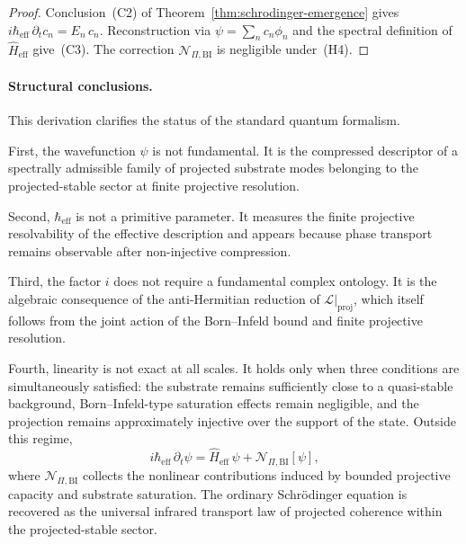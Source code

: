     \begin{proof}
      Conclusion~(C2) of Theorem~\ref{thm:schrodinger-emergence} gives
      $i\hbar_{\mathrm{eff}}\,\partial_t c_n = E_n\,c_n$.
      Reconstruction via $\psi = \sum_n c_n\phi_n$ and the spectral definition of
      $\hat{H}_{\mathrm{eff}}$ give~(C3).
      The correction $\mathcal{N}_{\Pi,\mathrm{BI}}$ is negligible under~(H4).
      \end{proof}

    \paragraph{Structural conclusions.}

      This derivation clarifies the status of the standard quantum formalism.

      First, the wavefunction $\psi$ is not fundamental.
      It is the compressed descriptor of a spectrally admissible family of projected substrate
      modes belonging to the projected-stable sector at finite projective resolution.

      Second, $\hbar_{\mathrm{eff}}$ is not a primitive parameter.
      It measures the finite projective resolvability of the effective description and appears
      because phase transport remains observable after non-injective compression.

      Third, the factor $i$ does not require a fundamental complex ontology.
      It is the algebraic consequence of the anti-Hermitian reduction of
      $\mathcal{L}|_{\mathrm{proj}}$, which itself follows from the joint action of the
      Born--Infeld bound and finite projective resolution.

      Fourth, linearity is not exact at all scales.
      It holds only when three conditions are simultaneously satisfied: the substrate remains
      sufficiently close to a quasi-stable background, Born--Infeld-type saturation effects
      remain negligible, and the projection remains approximately injective over the support
      of the state.
      Outside this regime,
      \[
        i\hbar_{\mathrm{eff}}\,\partial_t \psi
        = \hat{H}_{\mathrm{eff}}\,\psi + \mathcal{N}_{\Pi,\mathrm{BI}}[\psi],
      \]
      where $\mathcal{N}_{\Pi,\mathrm{BI}}$ collects the nonlinear contributions induced by
      bounded projective capacity and substrate saturation.
      The ordinary Schr\"{o}dinger equation is recovered as the universal infrared transport
      law of projected coherence within the projected-stable sector.

